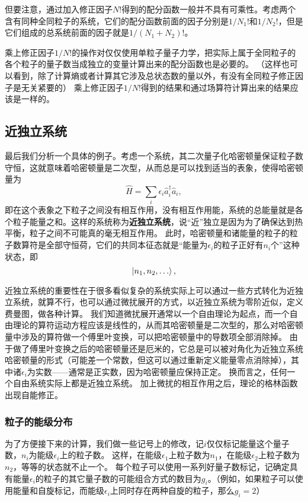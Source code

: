 \documentclass[hyperref, UTF8, a4paper]{ctexart}
\begin{document}
但要注意，通过加入修正因子$N!$得到的配分函数一般并不具有可乘性。考虑两个含有同种全同粒子的系统，它们的配分函数前面的因子分别是$1/N_1!$和$1/N_2!$，但是它们组成的总系统前面的因子就是$1/(N_1+N_2)!$。

乘上修正因子$1/N!$的操作对仅仅使用单粒子量子力学，把实际上属于全同粒子的各个粒子的量子数当成独立的变量计算出来的配分函数也是必要的。
（这样也可以看到，除了计算熵或者计算其它涉及总状态数的量以外，有没有全同粒子修正因子是无关紧要的）
乘上修正因子$1/N!$得到的结果和通过场算符计算出来的结果应该是一样的。

\subsection{近独立系统}

最后我们分析一个具体的例子。考虑一个系统，其二次量子化哈密顿量保证粒子数守恒，这就意味着哈密顿量是二次型，从而总是可以找到适当的表象，使得哈密顿量为
\begin{equation}
    \hat{H} = \sum_i \epsilon_i \hat{a}_i^\dagger \hat{a}_i,
\end{equation}
即在这个表象之下粒子之间没有相互作用，没有相互作用能，系统的总能量就是各个粒子能量之和。这样的系统称为\textbf{近独立系统}，说“近”独立是因为为了确保达到热平衡，粒子之间不可能真的毫无相互作用。
此时，哈密顿量和诸能量的粒子的粒子数算符是全部守恒荷，它们的共同本征态就是“能量为$\epsilon_i$的粒子正好有$n_i$个”这种状态，即
\[
    \ket{n_1, n_2, \ldots},
\]

近独立系统的重要性在于很多看似复杂的系统实际上可以通过一些方式转化为近独立系统，就算不行，也可以通过微扰展开的方式，以近独立系统为零阶近似，定义费曼图，做各种计算。
我们知道微扰展开通常以一个自由理论为起点，而一个自由理论的算符运动方程应该是线性的，从而其哈密顿量是二次型的，那么对哈密顿量中涉及的算符做一个傅里叶变换，可以把哈密顿量中的导数项全部消除掉。
由于做了傅里叶变换之后的哈密顿量还是厄米的，它总是可以被对角化为近独立系统哈密顿量的形式（可能差一个常数，但这可以通过重新定义能量零点消除掉），其中诸$\epsilon_i$为实数——通常是正实数，因为哈密顿量应保持正定。
换而言之，任何一个自由系统实际上都是近独立系统。
加上微扰的相互作用之后，理论的格林函数出现自能修正。

\subsubsection{粒子的能级分布}

为了方便接下来的计算，我们做一些记号上的修改，记$i$仅仅标记能量这个量子数，$n_i$为能级$\epsilon_i$上的粒子数。
这样，在能级$\epsilon_1$上粒子数为$n_1$，在能级$\epsilon_2$上粒子数为$n_2$，等等的状态就不止一个。
每个粒子可以使用一系列好量子数标记，记确定具有能量$\epsilon_i$的粒子的其它量子数的可能组合方式的数目为$g_i$。（例如，如果粒子可以使用能量和自旋标记，而能级$\epsilon_i$上同时存在两种自旋的粒子，那么$g_i=2$）
\end{document}
